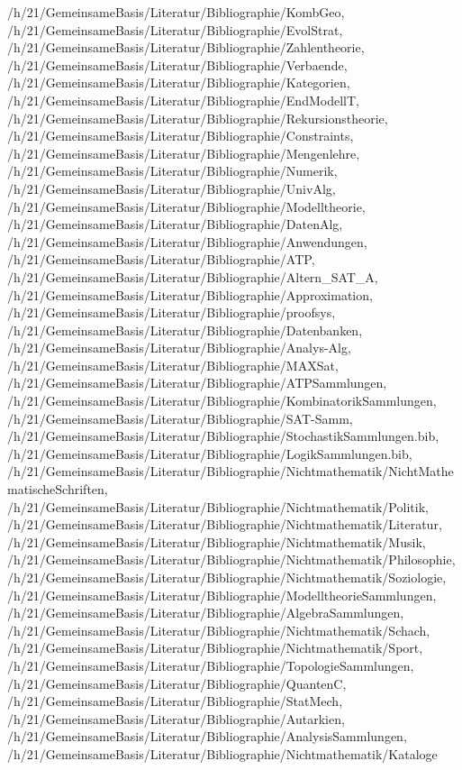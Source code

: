 {{  /h/21/GemeinsameBasis/Literatur/Bibliographie/KombGeo,%
  /h/21/GemeinsameBasis/Literatur/Bibliographie/EvolStrat,%
  /h/21/GemeinsameBasis/Literatur/Bibliographie/Zahlentheorie,%
  /h/21/GemeinsameBasis/Literatur/Bibliographie/Verbaende,%
  /h/21/GemeinsameBasis/Literatur/Bibliographie/Kategorien,%
  /h/21/GemeinsameBasis/Literatur/Bibliographie/EndModellT,%
  /h/21/GemeinsameBasis/Literatur/Bibliographie/Rekursionstheorie,%
  /h/21/GemeinsameBasis/Literatur/Bibliographie/Constraints,%
  /h/21/GemeinsameBasis/Literatur/Bibliographie/Mengenlehre,%
  /h/21/GemeinsameBasis/Literatur/Bibliographie/Numerik,%
  /h/21/GemeinsameBasis/Literatur/Bibliographie/UnivAlg,%
  /h/21/GemeinsameBasis/Literatur/Bibliographie/Modelltheorie,%
  /h/21/GemeinsameBasis/Literatur/Bibliographie/DatenAlg,%
  /h/21/GemeinsameBasis/Literatur/Bibliographie/Anwendungen,%
  /h/21/GemeinsameBasis/Literatur/Bibliographie/ATP,%
  /h/21/GemeinsameBasis/Literatur/Bibliographie/Altern_SAT_A,%
  /h/21/GemeinsameBasis/Literatur/Bibliographie/Approximation,%
  /h/21/GemeinsameBasis/Literatur/Bibliographie/proofsys,%
  /h/21/GemeinsameBasis/Literatur/Bibliographie/Datenbanken,%
  /h/21/GemeinsameBasis/Literatur/Bibliographie/Analys-Alg,%
  /h/21/GemeinsameBasis/Literatur/Bibliographie/MAXSat,%
  /h/21/GemeinsameBasis/Literatur/Bibliographie/ATPSammlungen,%
  /h/21/GemeinsameBasis/Literatur/Bibliographie/KombinatorikSammlungen,%
  /h/21/GemeinsameBasis/Literatur/Bibliographie/SAT-Samm,%
  /h/21/GemeinsameBasis/Literatur/Bibliographie/StochastikSammlungen.bib,%
  /h/21/GemeinsameBasis/Literatur/Bibliographie/LogikSammlungen.bib,%
  /h/21/GemeinsameBasis/Literatur/Bibliographie/Nichtmathematik/NichtMathematischeSchriften,%
  /h/21/GemeinsameBasis/Literatur/Bibliographie/Nichtmathematik/Politik,%
  /h/21/GemeinsameBasis/Literatur/Bibliographie/Nichtmathematik/Literatur,%
  /h/21/GemeinsameBasis/Literatur/Bibliographie/Nichtmathematik/Musik,%
  /h/21/GemeinsameBasis/Literatur/Bibliographie/Nichtmathematik/Philosophie,%
  /h/21/GemeinsameBasis/Literatur/Bibliographie/Nichtmathematik/Soziologie,%
  /h/21/GemeinsameBasis/Literatur/Bibliographie/ModelltheorieSammlungen,%
  /h/21/GemeinsameBasis/Literatur/Bibliographie/AlgebraSammlungen,%
  /h/21/GemeinsameBasis/Literatur/Bibliographie/Nichtmathematik/Schach,%
  /h/21/GemeinsameBasis/Literatur/Bibliographie/Nichtmathematik/Sport,%
  /h/21/GemeinsameBasis/Literatur/Bibliographie/TopologieSammlungen,%
  /h/21/GemeinsameBasis/Literatur/Bibliographie/QuantenC,%
  /h/21/GemeinsameBasis/Literatur/Bibliographie/StatMech,%
  /h/21/GemeinsameBasis/Literatur/Bibliographie/Autarkien,%
  /h/21/GemeinsameBasis/Literatur/Bibliographie/AnalysisSammlungen,%
  /h/21/GemeinsameBasis/Literatur/Bibliographie/Nichtmathematik/Kataloge%
}
}
